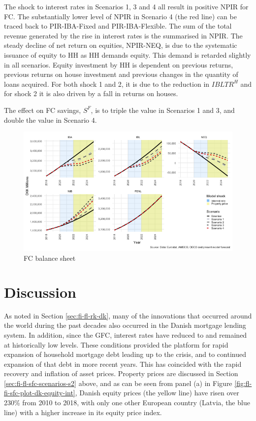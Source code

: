 \documentclass[
]{book}
\begin{document}
The shock to interest rates in Scenarios 1, 3 and 4 all result in positive NPIR for FC. The substantially lower level of NPIR in Scenario 4 (the red line) can be traced back to PIR-IBA-Fixed and PIR-IBA-Flexible. The sum of the total revenue generated by the rise in interest rates is the summarised in NPIR. The steady decline of net return on equities, NPIR-NEQ, is due to the systematic issuance of equity to HH as HH demands equity. This demand is retarded slightly in all scenarios. Equity investment by HH is dependent on previous returns, previous returns on house investment and previous changes in the quantity of loans acquired. For both shock 1 and 2, it is due to the reduction in \(IBLTR^H\) and for shock 2 it is also driven by a fall in returns on houses.

The effect on FC savings, \(S^F\), is to triple the value in Scenarios 1 and 3, and double the value in Scenario 4.

\begin{figure}[H]
\includegraphics[width=0.95\linewidth]{figures/fl-fi-sfc-plot-FC-bs-1} \caption{FC balance sheet}\label{fig:fl-fi-sfc-plot-FC-bs}
\end{figure}

\hypertarget{sec:fi-fl-sfc-discussion}{%
\section{Discussion}\label{sec:fi-fl-sfc-discussion}}

As noted in Section \ref{sec:fi-fl-rk-dk}, many of the innovations that occurred around the world during the past decades also occurred in the Danish mortgage lending system. In addition, since the GFC, interest rates have reduced to and remained at historically low levels. These conditions provided the platform for rapid expansion of household mortgage debt leading up to the crisis, and to continued expansion of that debt in more recent years. This has coincided with the rapid recovery and inflation of asset prices. Property prices are discussed in Section \ref{sec:fi-fl-sfc-scenarios-s2} above, and as can be seen from panel (a) in Figure \ref{fig:fl-fi-sfc-plot-dk-equity-int}, Danish equity prices (the yellow line) have risen over 230\% from 2010 to 2018, with only one other European country (Latvia, the blue line) with a higher increase in its equity price index.
\end{document}
